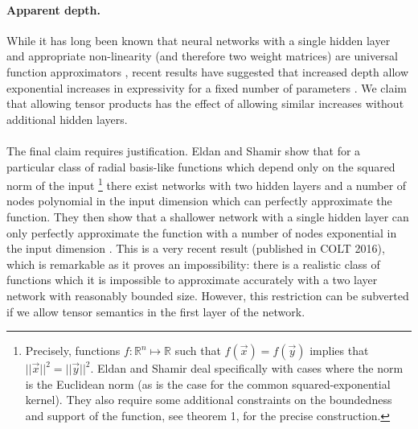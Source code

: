 \paragraph{Apparent depth.}
While it has long been known that neural networks with a single hidden layer and
appropriate non-linearity (and therefore two weight matrices)
 are universal function approximators \autocite{Hornik1989}, recent results
have suggested that increased depth allow exponential increases in expressivity for a fixed number
of parameters \autocite{Eldan2016, Telgarsky2016}. We claim that allowing tensor products has the effect
of allowing similar increases without additional hidden layers.
\paragraph{}
The final claim requires justification.
Eldan and Shamir show that for a
particular class of radial basis-like functions which depend only on the squared norm of the 
input
\footnote{Precisely, functions \(f : \mathbb{R}^n \mapsto \mathbb{R}\) such that
\(f(\vec{x}) = f(\vec{y})\) implies that \(||\vec{x}||^2 = ||\vec{y}||^2\). Eldan and Shamir
deal specifically with cases where the norm is the Euclidean norm (as is the case for the
common squared-exponential kernel). They also
require some additional constraints on the boundedness and support of the function, see
\autocite{Eldan2016} theorem 1, for the precise construction.}
there exist networks with two hidden layers and a number of nodes polynomial in the input dimension
which can perfectly approximate the function. They then show that a shallower network with a single
hidden layer can only perfectly approximate the function with a number of nodes exponential in the
input dimension \autocite{Eldan2016}. This is a very recent result (published in COLT 2016), which
is remarkable as it proves an impossibility: there is a realistic class of functions which it is
impossible to approximate accurately with a two layer network with reasonably bounded size. However,
this restriction can be subverted if we allow tensor semantics in the first layer of the network.

